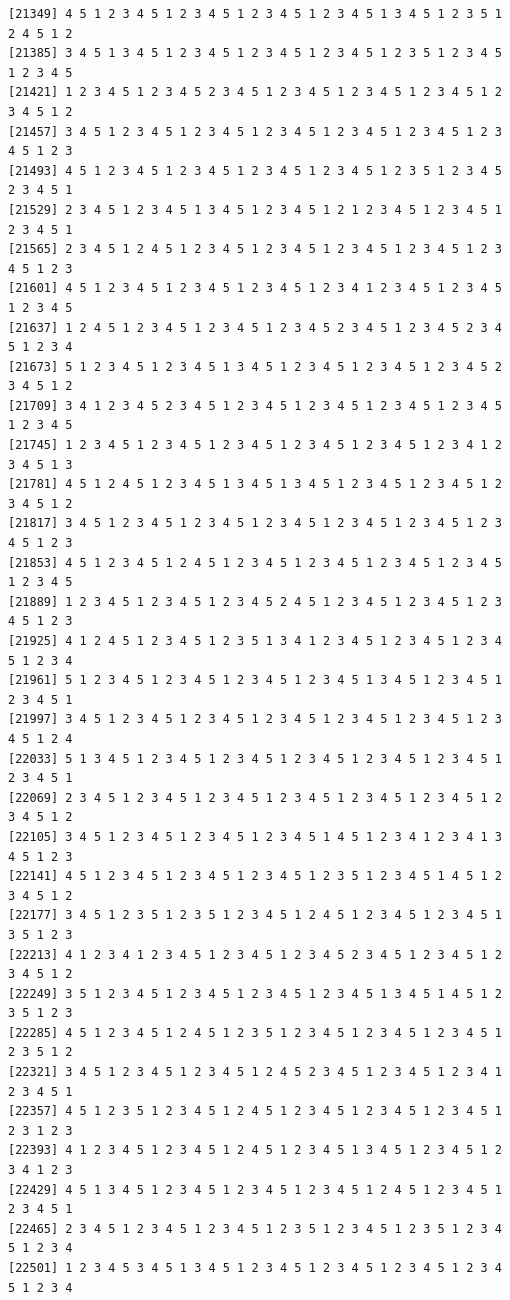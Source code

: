 \documentclass[
  english,
]{book}
\begin{document}
\begin{verbatim}
[21349] 4 5 1 2 3 4 5 1 2 3 4 5 1 2 3 4 5 1 2 3 4 5 1 3 4 5 1 2 3 5 1 2 4 5 1 2
[21385] 3 4 5 1 3 4 5 1 2 3 4 5 1 2 3 4 5 1 2 3 4 5 1 2 3 5 1 2 3 4 5 1 2 3 4 5
[21421] 1 2 3 4 5 1 2 3 4 5 2 3 4 5 1 2 3 4 5 1 2 3 4 5 1 2 3 4 5 1 2 3 4 5 1 2
[21457] 3 4 5 1 2 3 4 5 1 2 3 4 5 1 2 3 4 5 1 2 3 4 5 1 2 3 4 5 1 2 3 4 5 1 2 3
[21493] 4 5 1 2 3 4 5 1 2 3 4 5 1 2 3 4 5 1 2 3 4 5 1 2 3 5 1 2 3 4 5 2 3 4 5 1
[21529] 2 3 4 5 1 2 3 4 5 1 3 4 5 1 2 3 4 5 1 2 1 2 3 4 5 1 2 3 4 5 1 2 3 4 5 1
[21565] 2 3 4 5 1 2 4 5 1 2 3 4 5 1 2 3 4 5 1 2 3 4 5 1 2 3 4 5 1 2 3 4 5 1 2 3
[21601] 4 5 1 2 3 4 5 1 2 3 4 5 1 2 3 4 5 1 2 3 4 1 2 3 4 5 1 2 3 4 5 1 2 3 4 5
[21637] 1 2 4 5 1 2 3 4 5 1 2 3 4 5 1 2 3 4 5 2 3 4 5 1 2 3 4 5 2 3 4 5 1 2 3 4
[21673] 5 1 2 3 4 5 1 2 3 4 5 1 3 4 5 1 2 3 4 5 1 2 3 4 5 1 2 3 4 5 2 3 4 5 1 2
[21709] 3 4 1 2 3 4 5 2 3 4 5 1 2 3 4 5 1 2 3 4 5 1 2 3 4 5 1 2 3 4 5 1 2 3 4 5
[21745] 1 2 3 4 5 1 2 3 4 5 1 2 3 4 5 1 2 3 4 5 1 2 3 4 5 1 2 3 4 1 2 3 4 5 1 3
[21781] 4 5 1 2 4 5 1 2 3 4 5 1 3 4 5 1 3 4 5 1 2 3 4 5 1 2 3 4 5 1 2 3 4 5 1 2
[21817] 3 4 5 1 2 3 4 5 1 2 3 4 5 1 2 3 4 5 1 2 3 4 5 1 2 3 4 5 1 2 3 4 5 1 2 3
[21853] 4 5 1 2 3 4 5 1 2 4 5 1 2 3 4 5 1 2 3 4 5 1 2 3 4 5 1 2 3 4 5 1 2 3 4 5
[21889] 1 2 3 4 5 1 2 3 4 5 1 2 3 4 5 2 4 5 1 2 3 4 5 1 2 3 4 5 1 2 3 4 5 1 2 3
[21925] 4 1 2 4 5 1 2 3 4 5 1 2 3 5 1 3 4 1 2 3 4 5 1 2 3 4 5 1 2 3 4 5 1 2 3 4
[21961] 5 1 2 3 4 5 1 2 3 4 5 1 2 3 4 5 1 2 3 4 5 1 3 4 5 1 2 3 4 5 1 2 3 4 5 1
[21997] 3 4 5 1 2 3 4 5 1 2 3 4 5 1 2 3 4 5 1 2 3 4 5 1 2 3 4 5 1 2 3 4 5 1 2 4
[22033] 5 1 3 4 5 1 2 3 4 5 1 2 3 4 5 1 2 3 4 5 1 2 3 4 5 1 2 3 4 5 1 2 3 4 5 1
[22069] 2 3 4 5 1 2 3 4 5 1 2 3 4 5 1 2 3 4 5 1 2 3 4 5 1 2 3 4 5 1 2 3 4 5 1 2
[22105] 3 4 5 1 2 3 4 5 1 2 3 4 5 1 2 3 4 5 1 4 5 1 2 3 4 1 2 3 4 1 3 4 5 1 2 3
[22141] 4 5 1 2 3 4 5 1 2 3 4 5 1 2 3 4 5 1 2 3 5 1 2 3 4 5 1 4 5 1 2 3 4 5 1 2
[22177] 3 4 5 1 2 3 5 1 2 3 5 1 2 3 4 5 1 2 4 5 1 2 3 4 5 1 2 3 4 5 1 3 5 1 2 3
[22213] 4 1 2 3 4 1 2 3 4 5 1 2 3 4 5 1 2 3 4 5 2 3 4 5 1 2 3 4 5 1 2 3 4 5 1 2
[22249] 3 5 1 2 3 4 5 1 2 3 4 5 1 2 3 4 5 1 2 3 4 5 1 3 4 5 1 4 5 1 2 3 5 1 2 3
[22285] 4 5 1 2 3 4 5 1 2 4 5 1 2 3 5 1 2 3 4 5 1 2 3 4 5 1 2 3 4 5 1 2 3 5 1 2
[22321] 3 4 5 1 2 3 4 5 1 2 3 4 5 1 2 4 5 2 3 4 5 1 2 3 4 5 1 2 3 4 1 2 3 4 5 1
[22357] 4 5 1 2 3 5 1 2 3 4 5 1 2 4 5 1 2 3 4 5 1 2 3 4 5 1 2 3 4 5 1 2 3 1 2 3
[22393] 4 1 2 3 4 5 1 2 3 4 5 1 2 4 5 1 2 3 4 5 1 3 4 5 1 2 3 4 5 1 2 3 4 1 2 3
[22429] 4 5 1 3 4 5 1 2 3 4 5 1 2 3 4 5 1 2 3 4 5 1 2 4 5 1 2 3 4 5 1 2 3 4 5 1
[22465] 2 3 4 5 1 2 3 4 5 1 2 3 4 5 1 2 3 5 1 2 3 4 5 1 2 3 5 1 2 3 4 5 1 2 3 4
[22501] 1 2 3 4 5 3 4 5 1 3 4 5 1 2 3 4 5 1 2 3 4 5 1 2 3 4 5 1 2 3 4 5 1 2 3 4

\end{verbatim}
\end{document}
